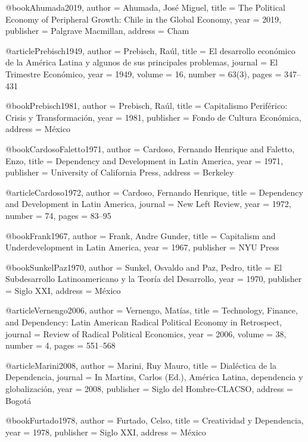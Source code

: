 @book{Ahumada2019,
	author    = {Ahumada, Jos{\'e} Miguel},
	title     = {The Political Economy of Peripheral Growth: {Chile} in the Global Economy},
	year      = {2019},
	publisher = {Palgrave Macmillan},
	address   = {Cham}
}

@article{Prebisch1949,
	author  = {Prebisch, Ra{\'u}l},
	title   = {El desarrollo econ{\'o}mico de la {Am{\'e}rica Latina} y algunos de sus principales problemas},
	journal = {El Trimestre Econ{\'o}mico},
	year    = {1949},
	volume  = {16},
	number  = {63(3)},
	pages   = {347--431}
}

@book{Prebisch1981,
	author    = {Prebisch, Ra{\'u}l},
	title     = {Capitalismo Perif{\'e}rico: Crisis y Transformaci{\'o}n},
	year      = {1981},
	publisher = {Fondo de Cultura Econ{\'o}mica},
	address   = {M{\'e}xico}
}

@book{CardosoFaletto1971,
	author    = {Cardoso, Fernando Henrique and Faletto, Enzo},
	title     = {Dependency and Development in {Latin America}},
	year      = {1971},
	publisher = {University of California Press},
	address   = {Berkeley}
}

@article{Cardoso1972,
	author  = {Cardoso, Fernando Henrique},
	title   = {Dependency and Development in {Latin America}},
	journal = {New Left Review},
	year    = {1972},
	number  = {74},
	pages   = {83--95}
}

@book{Frank1967,
	author    = {Frank, Andre Gunder},
	title     = {Capitalism and Underdevelopment in {Latin America}},
	year      = {1967},
	publisher = {NYU Press}
}

@book{SunkelPaz1970,
	author    = {Sunkel, Osvaldo and Paz, Pedro},
	title     = {El Subdesarrollo Latinoamericano y la Teor{\'i}a del Desarrollo},
	year      = {1970},
	publisher = {Siglo XXI},
	address   = {M{\'e}xico}
}

@article{Vernengo2006,
	author  = {Vernengo, Mat{\'i}as},
	title   = {Technology, Finance, and Dependency: {Latin American} Radical Political Economy in Retrospect},
	journal = {Review of Radical Political Economics},
	year    = {2006},
	volume  = {38},
	number  = {4},
	pages   = {551--568}
}

@article{Marini2008,
	author  = {Marini, Ruy Mauro},
	title   = {Dial{\'e}ctica de la Dependencia},
	journal = {In Martins, Carlos (Ed.), Am{\'e}rica Latina, dependencia y globalizaci{\'o}n},
	year    = {2008},
	publisher = {Siglo del Hombre-CLACSO},
	address   = {Bogot{\'a}}
}

@book{Furtado1978,
	author    = {Furtado, Celso},
	title     = {Creatividad y Dependencia},
	year      = {1978},
	publisher = {Siglo XXI},
	address   = {M{\'e}xico}
}

